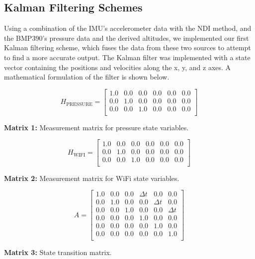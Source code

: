 \subsection{Kalman Filtering Schemes}
Using a combination of the IMU's accelerometer data with the NDI method, and the BMP390's pressure data and the derived altitudes, we implemented our first Kalman filtering scheme, which fuses the data from these two sources to attempt to find a more accurate output. The Kalman filter was implemented with a state vector containing the positions and velocities along the x, y, and z axes. A mathematical formulation of the filter is shown below.
\par
\[
H_{\text{PRESSURE}} =
\begin{bmatrix}
1.0 & 0.0 & 0.0 & 0.0 & 0.0 & 0.0 \\
0.0 & 1.0 & 0.0 & 0.0 & 0.0 & 0.0 \\
0.0 & 0.0 & 1.0 & 0.0 & 0.0 & 0.0 \\
\end{bmatrix}
\]
\begin{center}
\textbf{Matrix 1:} Measurement matrix for pressure state variables.
\end{center}


\[
H_{\text{WIFI}} =
\begin{bmatrix}
1.0 & 0.0 & 0.0 & 0.0 & 0.0 & 0.0 \\
0.0 & 1.0 & 0.0 & 0.0 & 0.0 & 0.0 \\
0.0 & 0.0 & 1.0 & 0.0 & 0.0 & 0.0 \\
\end{bmatrix}
\]
\begin{center}
\textbf{Matrix 2:} Measurement matrix for WiFi state variables.
\end{center}


\[
A =
\begin{bmatrix}
1.0 & 0.0 & 0.0 & \Delta t & 0.0 & 0.0 \\
0.0 & 1.0 & 0.0 & 0.0 & \Delta t & 0.0 \\
0.0 & 0.0 & 1.0 & 0.0 & 0.0 & \Delta t \\
0.0 & 0.0 & 0.0 & 1.0 & 0.0 & 0.0 \\
0.0 & 0.0 & 0.0 & 0.0 & 1.0 & 0.0 \\
0.0 & 0.0 & 0.0 & 0.0 & 0.0 & 1.0 \\
\end{bmatrix}
\]
\begin{center}
\textbf{Matrix 3:} State transition matrix.
\end{center}

